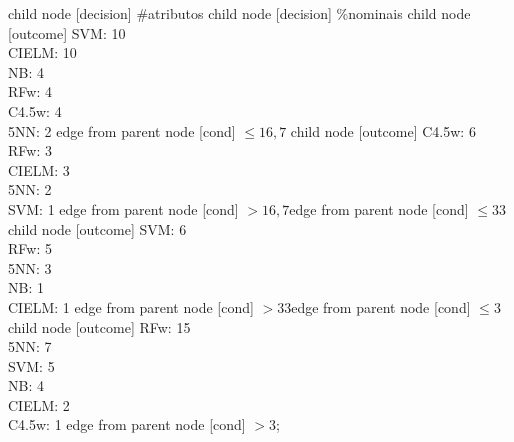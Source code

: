 child {node [decision] {\#atributos}
child {node [decision] {\%nominais}
child {node [outcome] {
SVM: 10\\
CIELM: 10\\
NB: 4\\
RFw: 4\\
C4.5w: 4\\
5NN: 2} edge from parent node [cond] {$\leq16,7$}}
child {node [outcome] {
C4.5w: 6\\
RFw: 3\\
CIELM: 3\\
5NN: 2\\
SVM: 1} edge from parent node [cond] {$>16,7$}}edge from parent node [cond] {$\leq33$}}
child {node [outcome] {
SVM: 6\\
RFw: 5\\
5NN: 3\\
NB: 1\\
CIELM: 1} edge from parent node [cond] {$>33$}}edge from parent node [cond] {$\leq3$}}
child {node [outcome] {
RFw: 15\\
5NN: 7\\
SVM: 5\\
NB: 4\\
CIELM: 2\\
C4.5w: 1} edge from parent node [cond] {$>3$}};